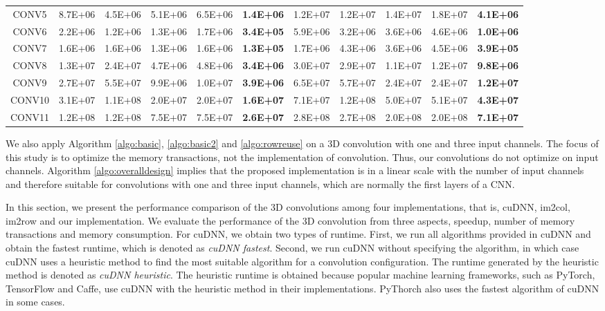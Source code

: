 \begin{table}[]
\begin{tabular}{c|ccccc|ccccc}
CONV5& 8.7E+06& 4.5E+06& 5.1E+06& 6.5E+06& \textbf{1.4E+06}& 1.2E+07& 1.2E+07& 1.4E+07& 1.8E+07& \textbf{4.1E+06}\\
CONV6& 2.2E+06& 1.2E+06& 1.3E+06& 1.7E+06& \textbf{3.4E+05}& 5.9E+06& 3.2E+06& 3.6E+06& 4.6E+06& \textbf{1.0E+06}\\
CONV7& 1.6E+06& 1.6E+06& 1.3E+06& 1.6E+06& \textbf{1.3E+05}& 1.7E+06& 4.3E+06& 3.6E+06& 4.5E+06& \textbf{3.9E+05}\\
CONV8& 1.3E+07& 2.4E+07& 4.7E+06& 4.8E+06& \textbf{3.4E+06}& 3.0E+07& 2.9E+07& 1.1E+07& 1.2E+07& \textbf{9.8E+06}\\
CONV9& 2.7E+07& 5.5E+07& 9.9E+06& 1.0E+07& \textbf{3.9E+06}& 6.5E+07& 5.7E+07& 2.4E+07& 2.4E+07& \textbf{1.2E+07}\\
CONV10& 3.1E+07& 1.1E+08& 2.0E+07& 2.0E+07& \textbf{1.6E+07}& 7.1E+07& 1.2E+08& 5.0E+07& 5.1E+07& \textbf{4.3E+07}\\
CONV11& 1.2E+08& 1.2E+08& 7.5E+07& 7.5E+07& \textbf{2.6E+07}& 2.8E+08& 2.7E+08& 2.0E+08& 2.0E+08& \textbf{7.1E+07}\\ \hline
\end{tabular}
\end{table}

We also apply Algorithm \ref{algo:basic}, \ref{algo:basic2} and \ref{algo:rowreuse} on a 3D convolution with one and three input channels. The focus of this study is to optimize the memory transactions, not the implementation of convolution. Thus, our convolutions do not optimize on
input channels. Algorithm \ref{algo:overalldesign} implies that the proposed implementation is in a linear scale with the number of input channels and therefore suitable for convolutions with one and three input channels, which are normally the first layers of a CNN.

In this section, we present the performance comparison of the 3D convolutions among four implementations, that is, cuDNN, im2col, im2row and our implementation. We
evaluate the performance of the 3D convolution from three aspects, speedup, number of memory transactions and memory consumption.
For cuDNN, we obtain two types of runtime. First, we run all algorithms provided in cuDNN and obtain the fastest runtime, which is denoted
as \emph{cuDNN fastest}. Second, we run cuDNN without specifying the algorithm, in which case cuDNN uses a heuristic method to find the most suitable algorithm for a convolution configuration. The runtime generated by the heuristic method is denoted as \emph{cuDNN
heuristic}. The heuristic runtime is obtained because popular machine learning frameworks, such as PyTorch, TensorFlow and Caffe,
use cuDNN with  the heuristic method in their implementations. PyThorch also uses the fastest algorithm of cuDNN in some cases.

